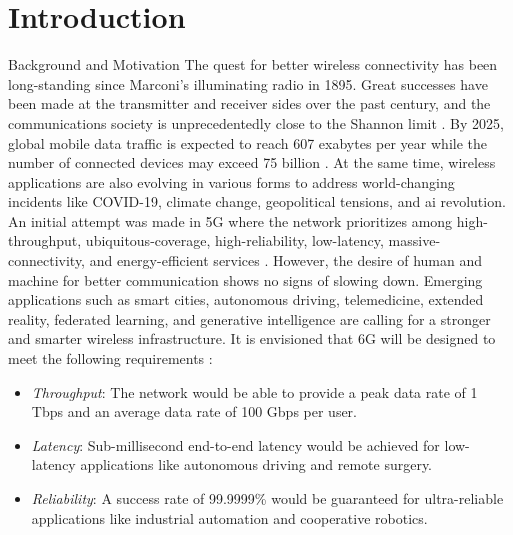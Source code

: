 
\graphicspath{{assets/chapter_1/}}

\chapter{Introduction}\label{ch:introduction}

\begin{section}{Background and Motivation}
	The quest for better wireless connectivity has been long-standing since Marconi's illuminating radio in 1895.
	Great successes have been made at the transmitter and receiver sides over the past century, and the communications society is unprecedentedly close to the Shannon limit \cite{Shannon1948}.
	By 2025, global mobile data traffic is expected to reach {607} exabytes per year \cite{Tariq2020} while the number of connected devices may exceed {75} billion \cite{Georgiev2024}.
	At the same time, wireless applications are also evolving in various forms to address world-changing incidents like COVID-19, climate change, geopolitical tensions, and \gls{ai} revolution.
	An initial attempt was made in 5G where the network prioritizes among high-throughput, ubiquitous-coverage, high-reliability, low-latency, massive-connectivity, and energy-efficient services \cite{Shafi2017}.
	However, the desire of human and machine for better communication shows no signs of slowing down.
	Emerging applications such as smart cities, autonomous driving, telemedicine, extended reality, federated learning, and generative intelligence are calling for a stronger and smarter wireless infrastructure.
	It is envisioned that 6G will be designed to meet the following requirements \cite{Tataria2021,Alsabah2021,Jiang2021}:
	\begin{itemize}
		\item \emph{Throughput}: The network would be able to provide a peak data rate of 1 Tbps and an average data rate of 100 Gbps per user.
		\item \emph{Latency}: Sub-millisecond end-to-end latency would be achieved for low-latency applications like autonomous driving and remote surgery.
		\item \emph{Reliability}: A success rate of 99.9999\% would be guaranteed for ultra-reliable applications like industrial automation and cooperative robotics.

\end{itemize}
\end{section}
